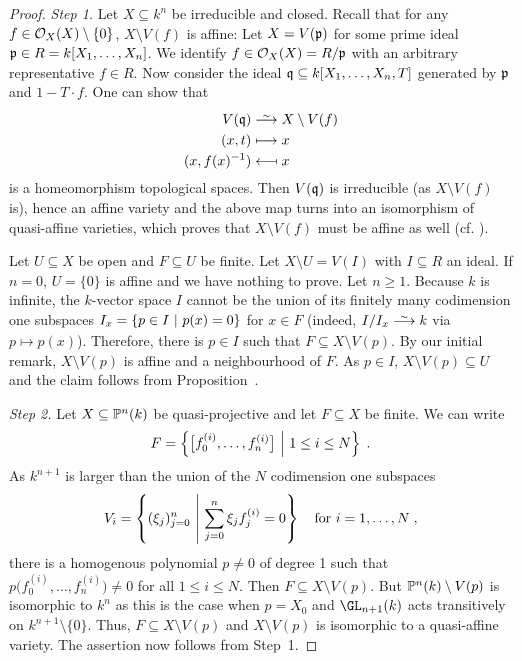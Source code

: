 \documentclass[a4paper,parskip=half,numbers=enddot, DIV=12]{scrreprt}
\begin{document}
\begin{proof}
	\emph{Step 1.} Let $X\subseteq k^n$ be irreducible and closed. Recall that for any $f\in \mathcal{O}_X(X)\setminus\{0\}$, $X\setminus V(f)$ is affine: Let $X=V(\mathfrak{p})$ for some prime ideal $\mathfrak{p}\in R=k[X_1,\ldots,X_n]$. We identify $f\in \mathcal{O}_X(X)=R/\mathfrak{p}$ with an arbitrary representative $f\in R$. Now consider the ideal $\mathfrak{q}\subseteq k[X_1,\ldots,X_n,T]$ generated by $\mathfrak{p}$ and $1-T\cdot f$. One can show that
	\begin{align*}
		V(\qq) &\isomorphism X\setminus V(f)\\
		(x,t) &\longmapsto x \\
		(x,f(x)^{-1}) &\longmapsfrom x
	\end{align*}
	is a homeomorphism topological spaces. Then $V(\mathfrak{q})$ is irreducible (as $X\setminus V(f)$ is), hence an affine variety and the above map turns into an isomorphism of quasi-affine varieties, which proves that $X\setminus V(f)$ must be affine as well (cf. \cite[Proposition~2.2.4]{alg1}).
	
	Let $U\subseteq X$ be open and $F\subseteq U$ be finite. Let $X\setminus U = V(I)$ with $I\subseteq R$ an ideal. If $n=0$, $U = \{0\}$ is affine and we have nothing to prove. Let $n\geq 1$. Because $k$ is infinite, the $k$-vector space $I$ cannot be the union of its finitely many codimension one subspaces $I_x=\left\{p\in I\ \middle|\  p(x) = 0\right\}$ for $x\in F$ (indeed, $I/I_x\isomorphism k$ via $p\mapsto p(x)$). Therefore, there is $p\in I$ such that $F\subseteq X\setminus V(p)$. By our initial remark, $X\setminus V(p)$ is affine and a neighbourhood of $F$. As $p\in I$, $X\setminus V(p)\subseteq U$ and the claim follows from Proposition~.
	
	\emph{Step 2.} Let $X\subseteq \mathbb{P}^n(k)$ be quasi-projective and let $F\subseteq X$ be finite. We can write 
	\begin{align*}
		F=\left\{\big[f_0^{(i)},\ldots, f_n^{(i)}\big]\ \middle|\  1\leq i \leq N\right\}\;.
	\end{align*} 
	As $k^{n+1}$ is larger than the union of the $N$ codimension one subspaces \begin{align*}
		V_i=\left\{(\xi_j)_{j=0}^n\ \middle|\  \sum_{j=0}^n \xi_j f_j^{(i)} = 0\right\}\quad\text{for }i=1,\ldots,N\;,
	\end{align*} 
	there is a homogenous polynomial $p\neq 0$ of degree 1 such that $p\big(f_0^{(i)},\ldots, f_n^{(i)}\big) \neq 0$ for all $1\leq i\leq N$. Then $F\subseteq X\setminus V(p)$. But $\mathbb{P}^n(k)\setminus V(p)$ is isomorphic to $k^n$ as this is the case when $p= X_0$ and $\GL_{n+1}(k)$ acts transitively on $k^{n+1}\setminus\{0\}$. Thus, $F\subseteq X\setminus V(p)$ and $X\setminus V(p)$ is isomorphic to a quasi-affine variety. The assertion now follows from Step~1.
\end{proof}
\end{document}
